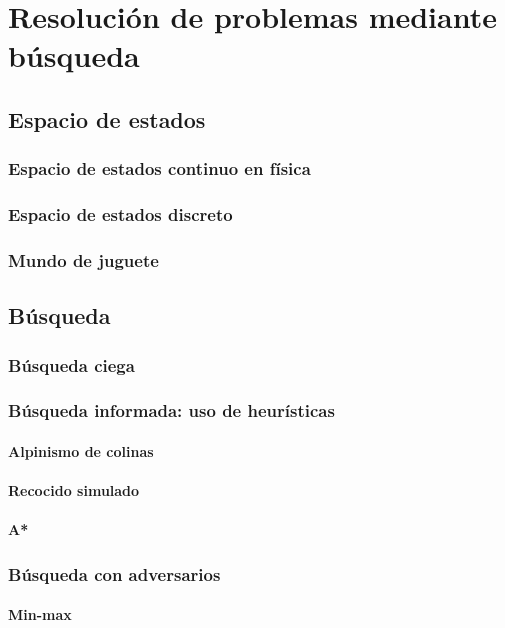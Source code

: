 \documentclass[12pt,openany]{book}
\begin{document}
\part{Resolución de problemas mediante búsqueda}
\chapter{Espacio de estados}
%
\section{Espacio de estados continuo en física}
\section{Espacio de estados discreto}
\section{Mundo de juguete}

\chapter{Búsqueda}
\section{Búsqueda ciega}



\section{Búsqueda informada: uso de heurísticas}
\subsection{Alpinismo de colinas}
\subsection{Recocido simulado}
\subsection{A*}

\section{Búsqueda con adversarios}
\subsection{Min-max}
\end{document}

